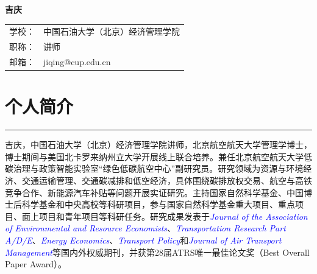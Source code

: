 \documentclass[letterpaper]{article}
\def\name{吉庆}
\newcommand{\journal}[1]{\textcolor{blue}{\textit{#1}}}
\renewenvironment{itemize}{
  \begin{list}{}{
    \setlength{\leftmargin}{0.2in}
    \setlength{\itemsep}{0.1in}
    \setlength{\parskip}{0.025in}
    \setlength{\parsep}{0.025in}
  }
}{
  \end{list}
}
\begin{document}
{\huge \bf \name}

\bigskip

  \begin{tabular}{ll}
    学校：& 中国石油大学（北京）经济管理学院 \\
    职称：& 讲师 \\
    邮箱：& jiqing@cup.edu.cn
  \end{tabular}


\section*{个人简介}
\hrule
\vspace{0.25cm}
\begin{itemize}
      \item 吉庆，中国石油大学（北京）经济管理学院讲师，北京航空航天大学管理学博士，博士期间与美国北卡罗来纳州立大学开展线上联合培养。兼任北京航空航天大学低碳治理与政策智能实验室“绿色低碳航空中心”副研究员。研究领域为资源与环境经济、交通运输管理、交通碳减排和低空经济，具体围绕碳排放权交易、航空与高铁竞争合作、新能源汽车补贴等问题开展实证研究。主持国家自然科学基金、中国博士后科学基金和中央高校等科研项目，参与国家自然科学基金重大项目、重点项目、面上项目和青年项目等科研任务。研究成果发表于\journal{Journal of the Association of Environmental and Resource Economists}、\journal{Transportation Research Part A/D/E}、\journal{Energy Economics}、\journal{Transport Policy}和\journal{Journal of Air Transport Management}等国内外权威期刊，并获第28届ATRS唯一最佳论文奖（Best Overall Paper Award）。
    \end{itemize}
\end{document}
